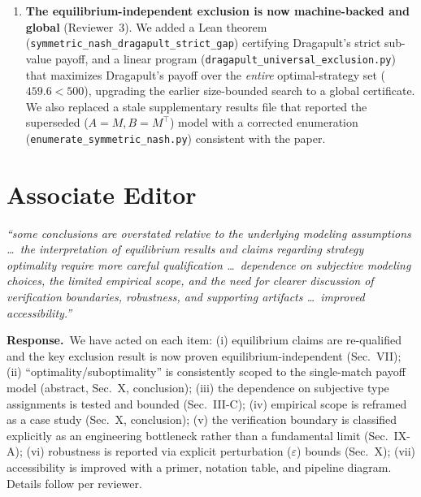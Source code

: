 \documentclass[11pt]{article}
\newcommand{\cmt}[1]{\par\smallskip\noindent\textit{#1}\par\smallskip}
\newcommand{\resp}{\par\noindent\textbf{Response.}\ }
\begin{document}
\begin{enumerate}[leftmargin=1.4em]
  re-audited the published artifact and corrected every count to its exact,
  grep-reproducible value: \textbf{87 files}, \textbf{$\sim$31{,}900 lines},
  \textbf{2{,}627 theorems}, of which \textbf{145} use \texttt{native\_decide} and
  \textbf{2{,}482} are kernel-checked (Table~IX rebuilt with the true per-category
  split; previous version's category counts were stale). One displayed
  expected-win-rate value (Ceruledge) was corrected from $44.8\%$ to its exact
  $45.4\%$. These were the only numeric discrepancies we found on a full recheck.
\item \textbf{The equilibrium-independent exclusion is now machine-backed and
  global} (Reviewer~3). We added a Lean theorem
  (\texttt{symmetric\_nash\_dragapult\_strict\_gap}) certifying Dragapult's strict
  sub-value payoff, and a linear program (\texttt{dragapult\_universal\_exclusion.py})
  that maximizes Dragapult's payoff over the \emph{entire} optimal-strategy set
  ($459.6 < 500$), upgrading the earlier size-bounded search to a global
  certificate. We also replaced a stale supplementary results file that reported
  the superseded ($A{=}M,B{=}M^\top$) model with a corrected enumeration
  (\texttt{enumerate\_symmetric\_nash.py}) consistent with the paper.
\end{enumerate}

\hrulefill

\section*{Associate Editor}
\cmt{``some conclusions are overstated relative to the underlying modeling
assumptions \ldots\ the interpretation of equilibrium results and claims regarding
strategy optimality require more careful qualification \ldots\ dependence on
subjective modeling choices, the limited empirical scope, and the need for clearer
discussion of verification boundaries, robustness, and supporting artifacts \ldots\
improved accessibility.''}
\resp We have acted on each item: (i) equilibrium claims are re-qualified and the
key exclusion result is now proven equilibrium-independent (Sec.~VII);
(ii) ``optimality/suboptimality'' is consistently scoped to the single-match
payoff model (abstract, Sec.~X, conclusion); (iii) the dependence on subjective
type assignments is tested and bounded (Sec.~III-C); (iv) empirical scope is
reframed as a case study (Sec.~X, conclusion); (v) the verification boundary is
classified explicitly as an engineering bottleneck rather than a fundamental
limit (Sec.~IX-A); (vi) robustness is reported via explicit perturbation
($\varepsilon$) bounds (Sec.~X); (vii) accessibility is improved with a primer,
notation table, and pipeline diagram. Details follow per reviewer.
\end{document}
